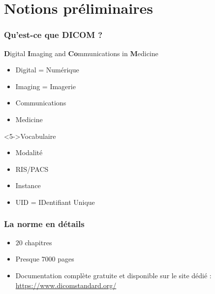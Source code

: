 \section{Notions pr\'eliminaires}

	\frame
	{
		\frametitle{Qu'est-ce que DICOM ?}
		
		\begin{block}{\textbf{D}igital \textbf{I}maging and \textbf{Co}mmunications in \textbf{M}edicine}
			\begin{itemize}
				\item<2-> Digital = Num\'erique
		    	\item<2-> Imaging = Imagerie
		    	\item<3-> Communications
		    	\item<4-> Medicine
			\end{itemize}
		\end{block}
		
		\begin{block}<5->{Vocabulaire}
		\begin{itemize}
			\item<6-> Modalit\'e
			\item<7-> RIS/PACS
			\item<8-> Instance
			\item<9-> UID = IDentifiant Unique
		\end{itemize}
		\end{block}
	}
	
	\frame
	{
		\frametitle{La norme en d\'etails}
		\begin{itemize}
			\item $20$ chapitres
			\item<2-> Presque $7000$ pages
			\item<3-> Documentation compl\`ete gratuite et disponible sur le site d\'edi\'e : \url{https://www.dicomstandard.org/}	
		\end{itemize}
	}

